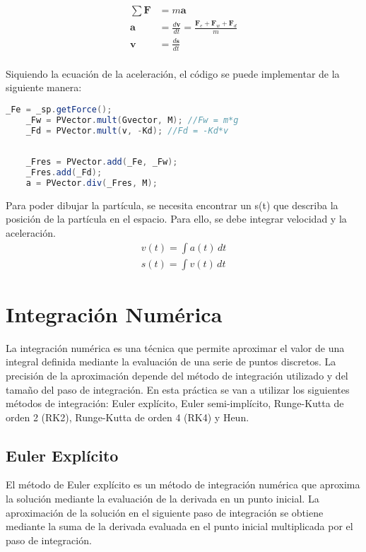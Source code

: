 \documentclass{article}
\begin{document}
\begin{align*}
    \sum\mathbf{F} & = m\mathbf{a}                                                                   \\
    \mathbf{a}     & = \frac{d\mathbf{v}}{dt} = \frac{\mathbf{F}_e + \mathbf{F}_w + \mathbf{F}_d}{m} \\
    \mathbf{v}     & = \frac{d\mathbf{s}}{dt}                                                        \\
\end{align*}

Siquiendo la ecuación de la aceleración, el código se puede implementar de la siguiente manera:

\begin{lstlisting}[language = Java, frame = single]
    _Fe = _sp.getForce(); 
    _Fw = PVector.mult(Gvector, M); //Fw = m*g
    _Fd = PVector.mult(v, -Kd); //Fd = -Kd*v
   
   
    _Fres = PVector.add(_Fe, _Fw);
    _Fres.add(_Fd);
    a = PVector.div(_Fres, M);
\end{lstlisting}

Para poder dibujar la partícula, se necesita encontrar un s(t) que describa la posición de la partícula en el espacio. Para ello, se debe integrar velocidad y la aceleración.
\begin{align*}
    v(t) = \int a(t) \, dt \\
    s(t) = \int v(t) \, dt
\end{align*}

\section{Integración Numérica}

La integración numérica es una técnica que permite aproximar el valor de una integral definida mediante la evaluación de una serie de puntos discretos. La precisión de la aproximación depende del método de integración utilizado y del tamaño del paso de integración. En esta práctica se van a utilizar los siguientes métodos de integración: Euler explícito, Euler semi-implícito, Runge-Kutta de orden 2 (RK2), Runge-Kutta de orden 4 (RK4) y Heun.

\subsection{Euler Explícito}

El método de Euler explícito es un método de integración numérica que aproxima la solución mediante la evaluación de la derivada en un punto inicial. La aproximación de la solución en el siguiente paso de integración se obtiene mediante la suma de la derivada evaluada en el punto inicial multiplicada por el paso de integración.
\end{document}
